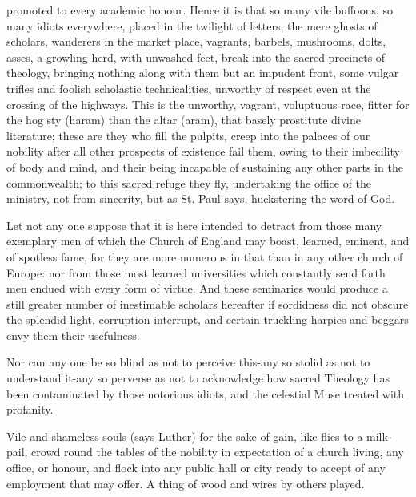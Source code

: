 {{promoted to every academic honour. Hence it is that so many vile buffoons, so
many idiots everywhere, placed in the twilight of letters, the mere ghosts of
scholars, wanderers in the market place, vagrants, barbels, mushrooms, dolts,
asses, a growling herd, with unwashed feet, break into the sacred precincts of
theology, bringing nothing along with them but an impudent front, some vulgar
trifles and foolish scholastic technicalities, unworthy of respect even at the
crossing of the highways. This is the unworthy, vagrant, voluptuous race,
fitter for the hog sty (haram) than the altar (aram), that basely prostitute
divine literature; these are they who fill the pulpits, creep into the palaces
of our nobility after all other prospects of existence fail them, owing to
their imbecility of body and mind, and their being incapable of sustaining any
other parts in the commonwealth; to this sacred refuge they fly, undertaking
the office of the ministry, not from sincerity, but as St. Paul says,
huckstering the word of God.

Let not any one suppose that it is here intended to detract from those many
exemplary men of which the Church of England may boast, learned, eminent, and
of spotless fame, for they are more numerous in that than in any other church
of Europe: nor from those most learned universities which constantly send forth
men endued with every form of virtue. And these seminaries would produce a
still greater number of inestimable scholars hereafter if sordidness did not
obscure the splendid light, corruption interrupt, and certain truckling harpies
and beggars envy them their usefulness.

Nor can any one be so blind as not to perceive this-any so stolid as not to
understand it-any so perverse as not to acknowledge how sacred Theology has
been contaminated by those notorious idiots, and the celestial Muse treated
with profanity.

Vile and shameless souls (says Luther) for the sake of gain, like flies to a
milk-pail, crowd round the tables of the nobility in expectation of a church
living, any office, or honour, and flock into any public hall or city ready to
accept of any employment that may offer. A thing of wood and wires by others
played.

}}
